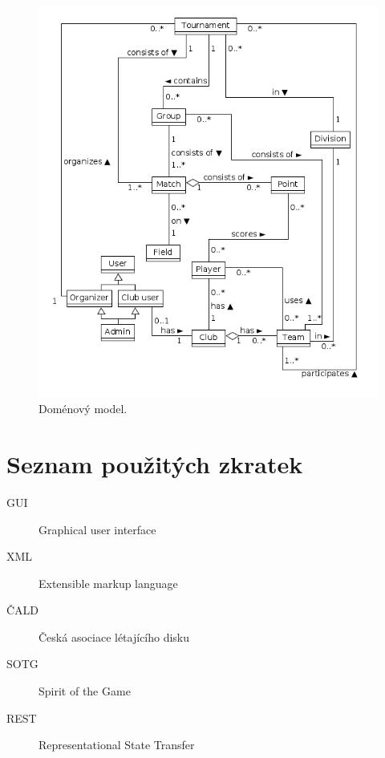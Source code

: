 \documentclass[thesis=B,czech]{FITthesis}[2012/06/26]
\begin{document}
\begin{figure}[ht!]
\centering
\includegraphics[width=130mm]{./images/domenovy-model.png}
\caption{Doménový model.\label{overflow}}
\label{fig:domain_model}
\end{figure}








\begin{conclusion}
\end{conclusion}

%
%
%



\appendix
% 
\chapter{Seznam použitých zkratek}
\begin{description}
	\item[GUI] Graphical user interface
	\item[XML] Extensible markup language
	\item[ČALD] Česká asociace létajícího disku
	\item[SOTG] Spirit of the Game
	\item[REST] Representational State Transfer
\end{description}
\end{document}
